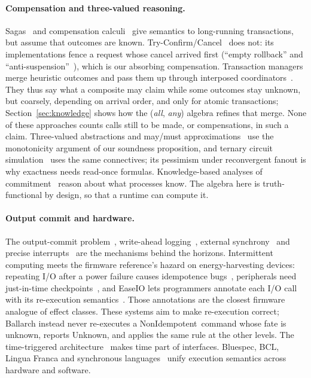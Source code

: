 \documentclass[11pt]{article}
\theoremstyle{definition}
\theoremstyle{plain}
\newcommand{\Unknown}{\textsf{Unknown}}
\newcommand{\NonIdem}{\textsf{NonIdempotent}}
\begin{document}
\paragraph{Compensation and three-valued reasoning.} Sagas~\citep{GarciaMolinaSalem1987} and compensation calculi~\citep{ButlerHoareFerreira2005,BruniMelgrattiMontanari2005} give semantics to long-running transactions, but assume that outcomes are known. Try-Confirm/\allowbreak Cancel~\citep{PardonPautasso2014TCC} does not: its implementations fence a request whose cancel arrived first (``empty rollback'' and ``anti-suspension''~\citep{SeataTCCFence}), which is our absorbing compensation. Transaction managers merge heuristic outcomes and pass them up through interposed coordinators~\citep{Narayana}. They thus say what a composite may claim while some outcomes stay unknown, but coarsely, depending on arrival order, and only for atomic transactions; Section~\ref{sec:knowledge} shows how the (\emph{all}, \emph{any}) algebra refines that merge. None of these approaches counts calls still to be made, or compensations, in such a claim. Three-valued abstractions and may/must approximations~\citep{LarsenThomsen1988,BrunsGodefroid1999} use the monotonicity argument of our soundness proposition, and ternary circuit simulation~\citep{Eichelberger1965} uses the same connectives; its pessimism under reconvergent fanout is why exactness needs read-once formulas. Knowledge-based analyses of commitment~\citep{HalpernMoses1990,Hadzilacos1987} reason about what processes know. The algebra here is truth-functional by design, so that a runtime can compute it.

\paragraph{Output commit and hardware.} The output-commit problem~\citep{StromYemini1985,Elnozahy2002}, write-ahead logging~\citep{Mohan1992ARIES}, external synchrony~\citep{Nightingale2005Speculator,Nightingale2006Rethink} and precise interrupts~\citep{SmithPleszkun1985} are the mechanisms behind the horizons. Intermittent computing meets the firmware reference's hazard on energy-harvesting devices: repeating I/O after a power failure causes idempotence bugs~\citep{Surbatovich2019IBIS}, peripherals need just-in-time checkpoints~\citep{Maeng2019Samoyed}, and EaseIO lets programmers annotate each I/O call with its re-execution semantics~\citep{Yildiz2023EaseIO}. Those annotations are the closest firmware analogue of effect classes. These systems aim to make re-execution correct; Ballarch instead never re-executes a \NonIdem\ command whose fate is unknown, reports \Unknown, and applies the same rule at the other levels. The time-triggered architecture~\citep{KopetzBauer2003} makes time part of interfaces. Bluespec, BCL, Lingua Franca and synchronous languages~\citep{Nikhil2004Bluespec,KingDaveArvind2012,Lohstroh2021LinguaFranca,BerryGonthier1992,Halbwachs1991Lustre} unify execution semantics across hardware and software.
\end{document}
